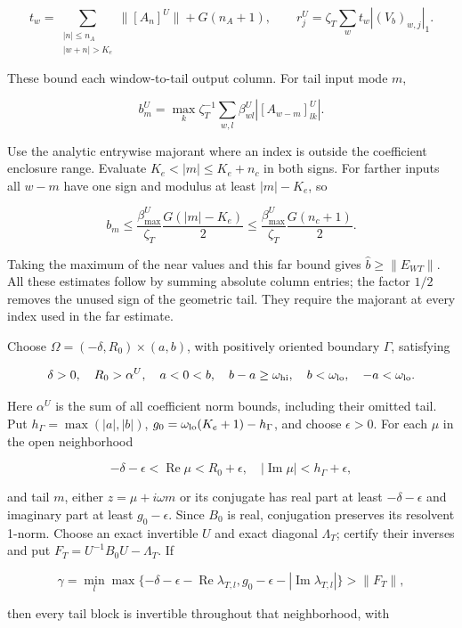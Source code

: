 \documentclass[11pt]{article}
\theoremstyle{definition}
\begin{document}
\[
 t_w=\sum_{\substack{|n|\le n_A\\|w+n|>K_e}}\|[A_n]^U\|+G(n_A+1),
 \qquad r_j^U=\zeta_T\sum_wt_w|(V_b)_{w,j}|_1.
\]

These bound each window-to-tail output column. For tail input mode $m$,

\[
 b_m^U=\max_k\zeta_T^{-1}\sum_{w,l}\beta_{wl}^U
                                      |[A_{w-m}]^U_{lk}|.
\]

Use the analytic entrywise majorant where an index is outside the coefficient enclosure range. Evaluate $K_e<|m|\le K_e+n_c$ in both signs. For farther inputs all $w-m$ have one sign and modulus at least $|m|-K_e$, so

\[
 b_m\le\frac{\beta_{\max}^U}{\zeta_T}\frac{G(|m|-K_e)}2
 \le\frac{\beta_{\max}^U}{\zeta_T}\frac{G(n_c+1)}2.
\]

Taking the maximum of the near values and this far bound gives $\widehat b\ge\|E_{WT}\|$. All these estimates follow by summing absolute column entries; the factor $1/2$ removes the unused sign of the geometric tail. They require the majorant at every index used in the far estimate.

Choose $\Omega=(-\delta,R_0)\times(a,b)$, with positively oriented boundary $\Gamma$, satisfying

\[
 \delta>0,\quad R_0>\alpha^U,
 \quad a<0<b,\quad b-a\ge\omega_{\rm hi},
 \quad b<\omega_{\rm lo},\quad -a<\omega_{\rm lo}.
\]

Here $\alpha^U$ is the sum of all coefficient norm bounds, including their omitted tail. Put $h_\Gamma=\max(|a|,|b|)$, $g_0=\omega_{\rm lo}(K_e+1)-h_\Gamma$, and choose $\epsilon>0$. For each $\mu$ in the open neighborhood

\[
 -\delta-\epsilon<\operatorname{Re}\mu<R_0+\epsilon,
 \quad |\operatorname{Im}\mu|<h_\Gamma+\epsilon,
\]

and tail $m$, either $z=\mu+i\omega m$ or its conjugate has real part at least $-\delta-\epsilon$ and imaginary part at least $g_0-\epsilon$. Since $B_0$ is real, conjugation preserves its resolvent 1-norm. Choose an exact invertible $U$ and exact diagonal $\Lambda_T$; certify their inverses and put $F_T=U^{-1}B_0U-\Lambda_T$. If

\[
 \gamma=\min_l\max\{-\delta-\epsilon-\operatorname{Re}\lambda_{T,l},
                         g_0-\epsilon-|\operatorname{Im}\lambda_{T,l}|\}
 >\|F_T\|,
\]

then every tail block is invertible throughout that neighborhood, with
\end{document}
